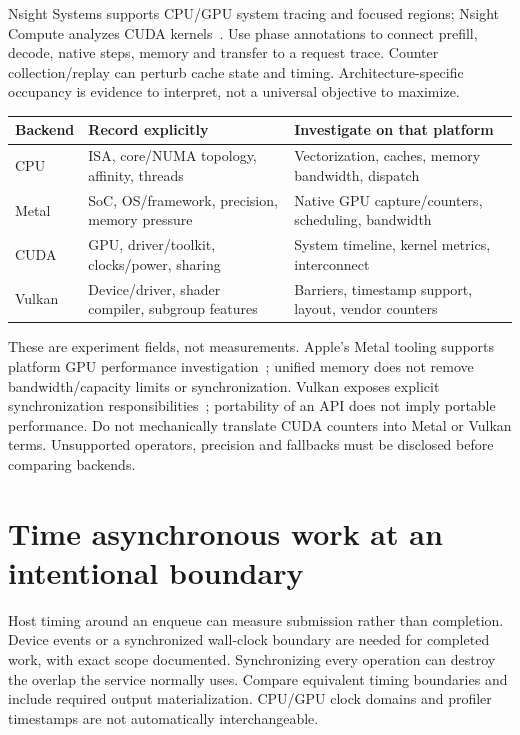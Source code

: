 Nsight Systems supports CPU/GPU system tracing and focused regions; Nsight
Compute analyzes CUDA kernels~\cite{nsys47,ncu47}. Use phase annotations to
connect prefill, decode, native steps, memory and transfer to a request trace.
Counter collection/replay can perturb cache state and timing. Architecture-specific
occupancy is evidence to interpret, not a universal objective to maximize.

\begin{center}\small
\begin{tabular}{p{19mm}p{54mm}p{65mm}}
\toprule Backend & Record explicitly & Investigate on that platform\\\midrule
CPU & ISA, core/NUMA topology, affinity, threads & Vectorization, caches, memory bandwidth, dispatch\\
Metal & SoC, OS/framework, precision, memory pressure & Native GPU capture/counters, scheduling, bandwidth\\
CUDA & GPU, driver/toolkit, clocks/power, sharing & System timeline, kernel metrics, interconnect\\
Vulkan & Device/driver, shader compiler, subgroup features & Barriers, timestamp support, layout, vendor counters\\
\bottomrule
\end{tabular}
\end{center}

These are experiment fields, not measurements. Apple's Metal tooling supports
platform GPU performance investigation~\cite{metal47}; unified memory does
not remove bandwidth/capacity limits or synchronization. Vulkan exposes
explicit synchronization responsibilities~\cite{vulkan47}; portability of an
API does not imply portable performance. Do not mechanically translate CUDA
counters into Metal or Vulkan terms. Unsupported operators, precision and
fallbacks must be disclosed before comparing backends.

\section{Time asynchronous work at an intentional boundary}
\label{evod47:sync}
Host timing around an enqueue can measure submission rather than completion.
Device events or a synchronized wall-clock boundary are needed for completed
work, with exact scope documented. Synchronizing every operation can destroy
the overlap the service normally uses. Compare equivalent timing boundaries
and include required output materialization. CPU/GPU clock domains and profiler
timestamps are not automatically interchangeable.

